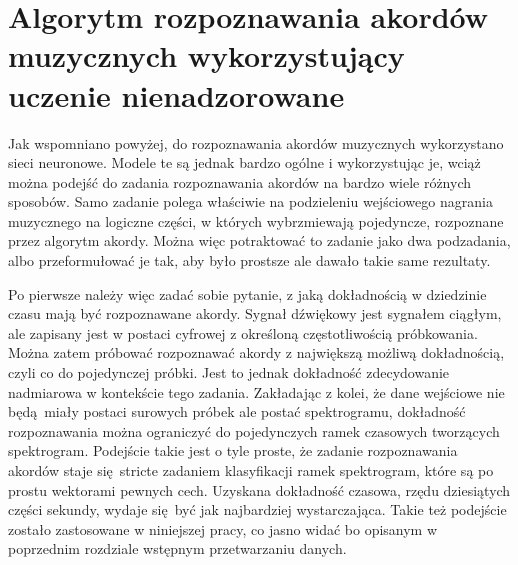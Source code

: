 \section{Algorytm rozpoznawania akordów muzycznych wykorzystujący uczenie nienadzorowane}

Jak wspomniano powyżej, do rozpoznawania akordów muzycznych wykorzystano sieci neuronowe. Modele te
są jednak bardzo ogólne i wykorzystując je, wciąż można podejść do zadania rozpoznawania akordów na
bardzo wiele różnych sposobów. Samo zadanie polega właściwie na podzieleniu wejściowego nagrania
muzycznego na logiczne części, w których wybrzmiewają pojedyncze, rozpoznane przez algorytm akordy.
Można więc potraktować to zadanie jako dwa podzadania, albo przeformułować je tak, aby było prostsze
ale dawało takie same rezultaty. 

Po pierwsze należy więc zadać sobie pytanie, z jaką dokładnością w dziedzinie czasu mają być
rozpoznawane akordy. Sygnał dźwiękowy jest sygnałem ciągłym, ale zapisany jest w postaci cyfrowej z
określoną częstotliwością próbkowania. Można zatem próbować rozpoznawać akordy z największą możliwą
dokładnością, czyli co do pojedynczej próbki. Jest to jednak dokładność zdecydowanie nadmiarowa w
kontekście tego zadania. Zakładając z kolei, że dane wejściowe nie będą miały postaci surowych
próbek ale postać spektrogramu, dokładność rozpoznawania można ograniczyć do pojedynczych ramek
czasowych tworzących spektrogram. Podejście takie jest o tyle proste, że zadanie rozpoznawania
akordów staje się stricte zadaniem klasyfikacji ramek spektrogram, które są po prostu wektorami
pewnych cech. Uzyskana dokładność czasowa, rzędu dziesiątych części sekundy, wydaje się być jak
najbardziej wystarczająca. Takie też podejście zostało zastosowane w niniejszej pracy, co jasno
widać bo opisanym w poprzednim rozdziale wstępnym przetwarzaniu danych.

